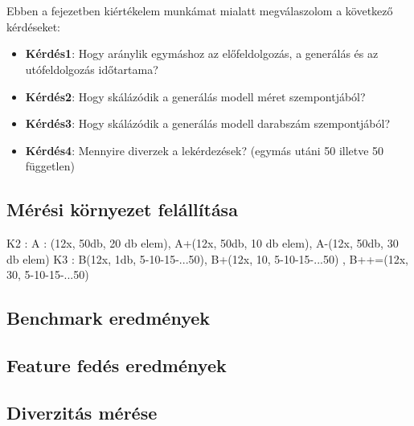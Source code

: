 \chapter{\evaluation}

Ebben a fejezetben kiértékelem munkámat mialatt megválaszolom a következő kérdéseket:

\begin{itemize}
	\item \textbf{Kérdés1}: Hogy aránylik egymáshoz az előfeldolgozás, a generálás és az utófeldolgozás időtartama?
	\item \textbf{Kérdés2}: Hogy skálázódik a generálás modell méret szempontjából?
	\item \textbf{Kérdés3}: Hogy skálázódik a generálás modell darabszám szempontjából?
	\item \textbf{Kérdés4}: Mennyire diverzek a lekérdezések? (egymás utáni 50 illetve 50 független) 
\end{itemize}
\section{Mérési környezet felállítása}
 K2 : A : (12x, 50db, 20 db elem), A+(12x, 50db, 10 db elem), A-(12x, 50db, 30 db elem)
 K3 : B(12x, 1db, 5-10-15-...50), B+(12x, 10, 5-10-15-...50) , B++=(12x, 30, 5-10-15-...50) 

\section{Benchmark eredmények}
\section{Feature fedés eredmények} 

\section{Diverzitás mérése}